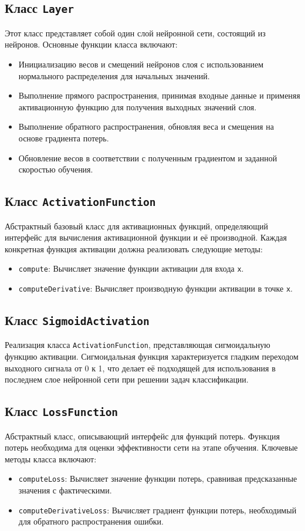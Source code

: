 \documentclass{article}
\begin{document}
\subsection{Класс \texttt{Layer}}
Этот класс представляет собой один слой нейронной сети, состоящий из нейронов. Основные функции класса включают:
\begin{itemize}
    \item Инициализацию весов и смещений нейронов слоя с использованием нормального распределения для начальных значений.
    \item Выполнение прямого распространения, принимая входные данные и применяя активационную функцию для получения выходных значений слоя.
    \item Выполнение обратного распространения, обновляя веса и смещения на основе градиента потерь.
    \item Обновление весов в соответствии с полученным градиентом и заданной скоростью обучения.
\end{itemize}

\subsection{Класс \texttt{ActivationFunction}}
Абстрактный базовый класс для активационных функций, определяющий интерфейс для вычисления активационной функции и её производной. Каждая конкретная функция активации должна реализовать следующие методы:
\begin{itemize}
    \item \texttt{compute}: Вычисляет значение функции активации для входа \texttt{x}.
    \item \texttt{computeDerivative}: Вычисляет производную функции активации в точке \texttt{x}.
\end{itemize}

\subsection{Класс \texttt{SigmoidActivation}}
Реализация класса \texttt{ActivationFunction}, представляющая сигмоидальную функцию активации. Сигмоидальная функция характеризуется гладким переходом выходного сигнала от 0 к 1, что делает её подходящей для использования в последнем слое нейронной сети при решении задач классификации.

\subsection{Класс \texttt{LossFunction}}
Абстрактный класс, описывающий интерфейс для функций потерь. Функция потерь необходима для оценки эффективности сети на этапе обучения. Ключевые методы класса включают:
\begin{itemize}
    \item \texttt{computeLoss}: Вычисляет значение функции потерь, сравнивая предсказанные значения с фактическими.
    \item \texttt{computeDerivativeLoss}: Вычисляет градиент функции потерь, необходимый для обратного распространения ошибки.
\end{itemize}
\end{document}
